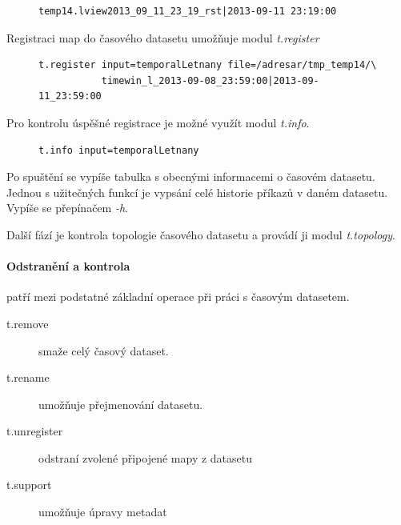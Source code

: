 \documentclass[a4paper,12pt,oneside]{report}
\begin{document}
\begin{figure}[h!]
\begin{footnotesize}
\lstset{extendedchars=false,
escapeinside=''}
\begin{lstlisting}[style=mybash]
temp14.lview2013_09_11_23_19_rst|2013-09-11 23:19:00                       
\end{lstlisting}
\end{footnotesize} 
\end{figure}

Registraci map do časového datasetu umožňuje modul \textit{t.register}
\begin{figure}[h!]
\begin{footnotesize}
\lstset{extendedchars=false,
escapeinside=''}
\begin{lstlisting}[style=mybash]
t.register input=temporalLetnany file=/adresar/tmp_temp14/\
           timewin_l_2013-09-08_23:59:00|2013-09-11_23:59:00        
\end{lstlisting}
\end{footnotesize} 
\end{figure}


Pro kontrolu úspěšné registrace je možné využít modul \textit{t.info}.
\begin{figure}[h!]
\begin{footnotesize}
\lstset{extendedchars=false,
escapeinside=''}
\begin{lstlisting}[style=mybash]
t.info input=temporalLetnany      
\end{lstlisting}
\end{footnotesize} 
\end{figure}

Po spuštění se vypíše tabulka s obecnými informacemi o časovém
datasetu. Jednou s užitečných funkcí je vypsání celé historie příkazů
v daném datasetu. Vypíše se přepínačem \emph{-h}.

Další fází je kontrola topologie časového datasetu a provádí ji modul
\textit{t.topology}.

\paragraph*{Odstranění a kontrola} patří mezi podstatné základní operace při práci s časovým datasetem.
\begin{description}
\item[t.remove] smaže celý časový dataset.  
\item[t.rename] umožňuje  přejmenování datasetu.
\item[t.unregister] odstraní zvolené připojené mapy z datasetu
\item[t.support] umožňuje úpravy metadat
\end{description}
\end{document}
